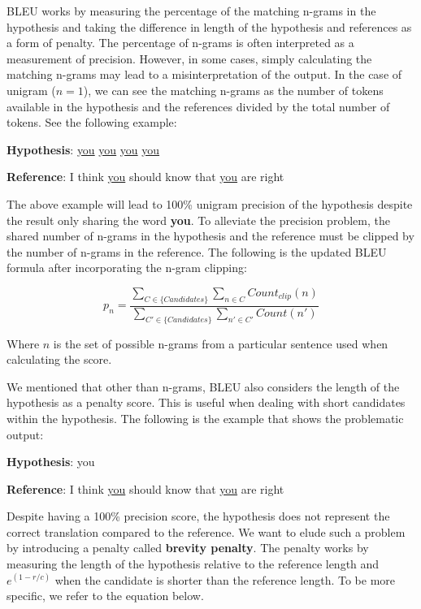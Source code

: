 BLEU works by measuring the percentage of the matching n-grams in the hypothesis and taking the difference in length of the hypothesis and references as a form of penalty. The percentage of n-grams is often interpreted as a measurement of precision. However, in some cases, simply calculating the matching n-grams may lead to a misinterpretation of the output. In the case of unigram ($n=1$), we can see the matching n-grams as the number of tokens available in the hypothesis and the references divided by the total number of tokens. See the following example:

\bigskip

\textbf{Hypothesis}: \underline{you} \underline{you} \underline{you} \underline{you}

\textbf{Reference}: I think \underline{you} should know that \underline{you} are right

\bigskip

The above example will lead to 100\% unigram precision of the hypothesis despite the result only sharing the word \textbf{you}. To alleviate the precision problem, the shared number of n-grams in the hypothesis and the reference must be clipped by the number of n-grams in the reference. The following is the updated BLEU formula after incorporating the n-gram clipping:

\begin{equation}
    p_n=\frac{\sum_{C\in\{Candidates\}}\sum_{n\in C}Count_{clip}(n)}{\sum_{C'\in\{Candidates\}}\sum_{n'\in C'}Count(n')}
\end{equation}

Where $n$ is the set of possible n-grams from a particular sentence used when calculating the score.

We mentioned that other than n-grams, BLEU also considers the length of the hypothesis as a penalty score. This is useful when dealing with short candidates within the hypothesis. The following is the example that shows the problematic output:

\bigskip

\textbf{Hypothesis}: you

\textbf{Reference}: I think \underline{you} should know that \underline{you} are right

\bigskip

Despite having a 100\% precision score, the hypothesis does not represent the correct translation compared to the reference. We want to elude such a problem by introducing a penalty called \textbf{brevity penalty}. The penalty works by measuring the length of the hypothesis relative to the reference length and  $e^{(1-r/c)}$ when the candidate is shorter than the reference length. To be more specific, we refer to the equation below.

